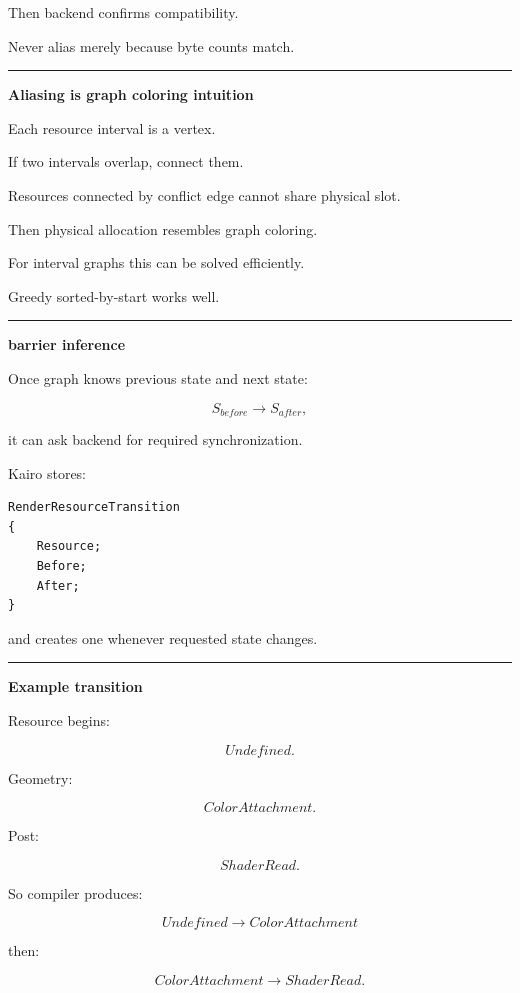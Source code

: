 Then backend confirms compatibility.

Never alias merely because byte counts match.

\begin{center}\rule{0.5\linewidth}{0.5pt}\end{center}

\textbf{Aliasing is graph coloring intuition}

Each resource interval is a vertex.

If two intervals overlap, connect them.

Resources connected by conflict edge cannot share physical slot.

Then physical allocation resembles graph coloring.

For interval graphs this can be solved efficiently.

Greedy sorted-by-start works well.

\begin{center}\rule{0.5\linewidth}{0.5pt}\end{center}

\textbf{barrier inference}

Once graph knows previous state and next state:

\[
S_{before}
\rightarrow
S_{after},
\]

it can ask backend for required synchronization.

Kairo stores:

\begin{verbatim}
RenderResourceTransition
{
    Resource;
    Before;
    After;
}
\end{verbatim}

and creates one whenever requested state changes.

\begin{center}\rule{0.5\linewidth}{0.5pt}\end{center}

\textbf{Example transition}

Resource begins:

\[
Undefined.
\]

Geometry:

\[
ColorAttachment.
\]

Post:

\[
ShaderRead.
\]

So compiler produces:

\[
Undefined
\rightarrow
ColorAttachment
\]

then:

\[
ColorAttachment
\rightarrow
ShaderRead.
\]

